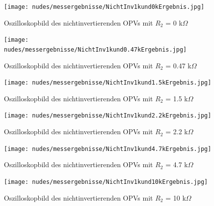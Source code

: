 \documentclass[12pt,a4paper,twoside]{article}
\begin{document}
\begin{figure}[H]
    \centering
    \texttt{[image: nudes/messergebnisse/NichtInv1kund0kErgebnis.jpg]}
    \caption{Oszilloskopbild des nichtinvertierenden OPVs mit $R_{2}$ = 0 k$\Omega$}
    \label{fig:Nichtinvertierender1k0kOszibild}
\end{figure}

\begin{figure}[H]
    \centering
    \texttt{[image: nudes/messergebnisse/NichtInv1kund0.47kErgebnis.jpg]}
    \caption{Oszilloskopbild des nichtinvertierenden OPVs mit $R_{2}$ = 0.47 k$\Omega$}
    \label{fig:Nichtinvertierender1k0.47kOszibild}
\end{figure}

\begin{figure}[H]
    \centering
    \texttt{[image: nudes/messergebnisse/NichtInv1kund1.5kErgebnis.jpg]}
    \caption{Oszilloskopbild des nichtinvertierenden OPVs mit $R_{2}$ = 1.5 k$\Omega$}
    \label{fig:Nichtinvertierender1k1.5kOszibild}
\end{figure}

\begin{figure}[H]
    \centering
    \texttt{[image: nudes/messergebnisse/NichtInv1kund2.2kErgebnis.jpg]}
    \caption{Oszilloskopbild des nichtinvertierenden OPVs mit $R_{2}$ = 2.2 k$\Omega$}
    \label{fig:Nichtinvertierender1k2.2kOszibild}
\end{figure}

\begin{figure}[H]
    \centering
    \texttt{[image: nudes/messergebnisse/NichtInv1kund4.7kErgebnis.jpg]}
    \caption{Oszilloskopbild des nichtinvertierenden OPVs mit $R_{2}$ = 4.7 k$\Omega$}
    \label{fig:Nichtinvertierender1k4.7kOszibild}
\end{figure}

\begin{figure}[H]
    \centering
    \texttt{[image: nudes/messergebnisse/NichtInv1kund10kErgebnis.jpg]}
    \caption{Oszilloskopbild des nichtinvertierenden OPVs mit $R_{2}$ = 10 k$\Omega$}
    \label{fig:Nichtinvertierender1k10kOszibild}
\end{figure}
\end{document}
